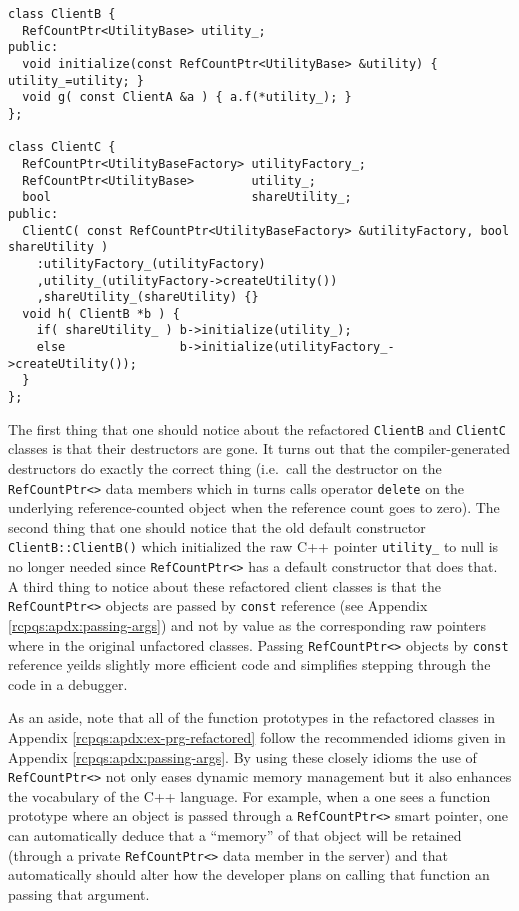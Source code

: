 \documentclass[pdf,ps2pdf,11pt]{SANDreport}
\begin{document}
{\small\begin{verbatim}
class ClientB {
  RefCountPtr<UtilityBase> utility_;
public:
  void initialize(const RefCountPtr<UtilityBase> &utility) { utility_=utility; }
  void g( const ClientA &a ) { a.f(*utility_); }
};

class ClientC {
  RefCountPtr<UtilityBaseFactory> utilityFactory_;
  RefCountPtr<UtilityBase>        utility_;
  bool                            shareUtility_;
public:
  ClientC( const RefCountPtr<UtilityBaseFactory> &utilityFactory, bool shareUtility )
    :utilityFactory_(utilityFactory)
    ,utility_(utilityFactory->createUtility())
    ,shareUtility_(shareUtility) {}
  void h( ClientB *b ) {
    if( shareUtility_ ) b->initialize(utility_);
    else                b->initialize(utilityFactory_->createUtility());
  }
};
\end{verbatim}}

The first thing that one should notice about the refactored
{}\texttt{ClientB} and {}\texttt{ClientC} classes is that their
destructors are gone.  It turns out that the compiler-generated
destructors do exactly the correct thing (i.e.~call the destructor on
the {}\texttt{Ref\-Count\-Ptr<>} data members which in turns calls
operator {}\texttt{delete} on the underlying reference-counted object
when the reference count goes to zero).  The second thing that one
should notice that the old default constructor
{}\texttt{ClientB::ClientB()} which initialized the raw C++ pointer
{}\texttt{utility\_} to null is no longer needed since
{}\texttt{Ref\-Count\-Ptr<>} has a default constructor that does that.
A third thing to notice about these refactored client classes is that
the {}\texttt{Ref\-Count\-Ptr<>} objects are passed by
{}\texttt{const} reference (see Appendix
{}\ref{rcpqs:apdx:passing-args}) and not by value as the corresponding
raw pointers where in the original unfactored classes.  Passing
{}\texttt{Ref\-Count\-Ptr<>} objects by {}\texttt{const} reference
yeilds slightly more efficient code and simplifies stepping through
the code in a debugger.

As an aside, note that all of the function prototypes in the
refactored classes in Appendix {}\ref{rcpqs:apdx:ex-prg-refactored}
follow the recommended idioms given in Appendix
{}\ref{rcpqs:apdx:passing-args}.  By using these closely idioms the
use of {}\texttt{Ref\-Count\-Ptr<>} not only eases dynamic memory
management but it also enhances the vocabulary of the C++ language.
For example, when a one sees a function prototype where an object is
passed through a {}\texttt{Ref\-Count\-Ptr<>} smart pointer, one can
automatically deduce that a ``memory'' of that object will be retained
(through a private {}\texttt{Ref\-Count\-Ptr<>} data member in the
server) and that automatically should alter how the developer plans on
calling that function an passing that argument.
\end{document}

